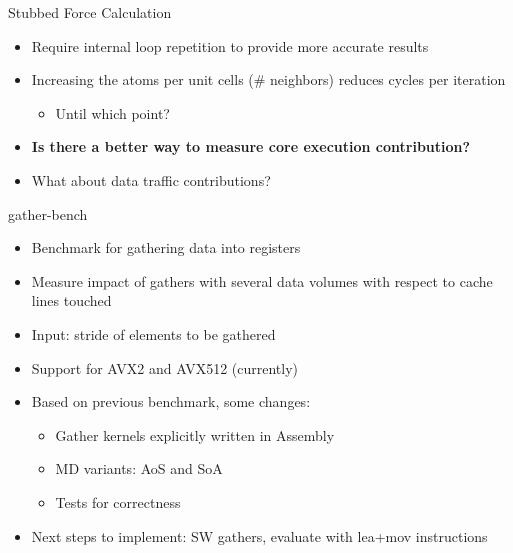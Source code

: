 \documentclass[aspectratio=169,t]{beamer}
\begin{document}
  \begin{frame}[fragile]{Stubbed Force Calculation}
    \begin{itemize}
      \item Require internal loop repetition to provide more accurate results
      \item Increasing the atoms per unit cells (\# neighbors) reduces cycles per iteration
      \begin{itemize}
        \item Until which point?
      \end{itemize}
      \item \textbf{Is there a better way to measure core execution contribution?}
      \item What about data traffic contributions?
    \end{itemize}
  \end{frame}

  \begin{frame}[fragile]{gather-bench}
    \begin{itemize}
      \item Benchmark for gathering data into registers
      \item Measure impact of gathers with several data volumes with respect to cache lines touched
      \item Input: stride of elements to be gathered
      \item Support for AVX2 and AVX512 (currently)
      \item Based on previous benchmark, some changes:
      \begin{itemize}
        \item Gather kernels explicitly written in Assembly
        \item MD variants: AoS and SoA
        \item Tests for correctness
      \end{itemize}
      \item Next steps to implement: SW gathers, evaluate with lea+mov instructions
    \end{itemize}
  \end{frame}
\end{document}
